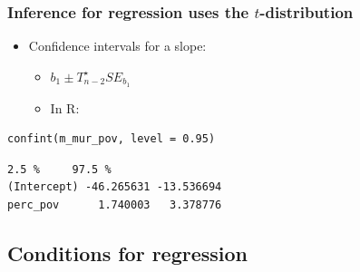 \documentclass[slidestop,compress,mathserif,12pt,t,professionalfonts,xcolor=table]{beamer}
\begin{document}
\begin{frame}[fragile]
\frametitle{Inference for regression uses the $t$-distribution}

\begin{itemize}


\item Confidence intervals for a slope: 
\begin{itemize}
\item $b_1 \pm T^\star_{n-2} SE_{b_1}$
\item In R:
\end{itemize}

\end{itemize}

{\scriptsize
\begin{Verbatim}[frame=single, formatcom=\color{blue}]
confint(m_mur_pov, level = 0.95)
\end{Verbatim}
}

{\scriptsize
\begin{Verbatim}[frame=single, formatcom=\color{gray}]
                 2.5 %     97.5 %
(Intercept) -46.265631 -13.536694
perc_pov      1.740003   3.378776
\end{Verbatim}
}

\end{frame}





\subsection{Conditions for regression}
\label{mi5}

\end{document}
